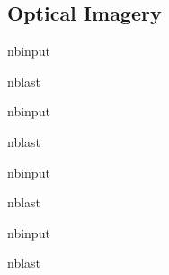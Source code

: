 \documentclass[letterpaper,10pt,english]{sphinxmanual}
\begin{document}
\subsection{Optical Imagery}
\label{\detokenize{notebooks/MudCreek_Landslide_optical:Optical-Imagery}}
\begin{sphinxuseclass}{nbinput}
\begin{sphinxuseclass}{nblast}
{
\begin{sphinxVerbatim}[commandchars=\\\{\}]
\llap{\color{nbsphinxin}[ ]:\,\hspace{\fboxrule}\hspace{\fboxsep}}
\end{sphinxVerbatim}
}

\end{sphinxuseclass}
\end{sphinxuseclass}
\begin{sphinxuseclass}{nbinput}
\begin{sphinxuseclass}{nblast}
{
\begin{sphinxVerbatim}[commandchars=\\\{\}]
\llap{\color{nbsphinxin}[ ]:\,\hspace{\fboxrule}\hspace{\fboxsep}}
\end{sphinxVerbatim}
}

\end{sphinxuseclass}
\end{sphinxuseclass}
\begin{sphinxuseclass}{nbinput}
\begin{sphinxuseclass}{nblast}
{
\begin{sphinxVerbatim}[commandchars=\\\{\}]
\llap{\color{nbsphinxin}[ ]:\,\hspace{\fboxrule}\hspace{\fboxsep}}
\end{sphinxVerbatim}
}

\end{sphinxuseclass}
\end{sphinxuseclass}
\begin{sphinxuseclass}{nbinput}
\begin{sphinxuseclass}{nblast}
{
\begin{sphinxVerbatim}[commandchars=\\\{\}]
\llap{\color{nbsphinxin}[ ]:\,\hspace{\fboxrule}\hspace{\fboxsep}}
\end{sphinxVerbatim}
}

\end{sphinxuseclass}
\end{sphinxuseclass}
\end{document}
